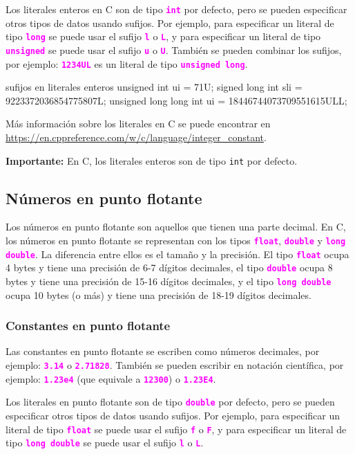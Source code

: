 \documentclass[]{scrartcl}
\newcommand{\hl}[1]{\textcolor{magenta}{\textbf{\texttt{#1}}}}
\begin{document}
Los literales enteros en C son de tipo \hl{int} por defecto, pero se pueden especificar otros tipos de datos usando sufijos. Por ejemplo, para especificar un literal de tipo \hl{long} se puede usar el sufijo \hl{l} o \hl{L}, y para especificar un literal de tipo \hl{unsigned} se puede usar el sufijo \hl{u} o \hl{U}. También se pueden combinar los sufijos, por ejemplo: \hl{1234UL} es un literal de tipo \hl{unsigned long}.

\begin{cbox}{sufijos en literales enteros}
  unsigned int ui = 71U;
  signed long int sli = 9223372036854775807L;
  unsigned long long int ui = 18446744073709551615ULL;
\end{cbox}

Más información sobre los literales en C se puede encontrar en \url{https://en.cppreference.com/w/c/language/integer_constant}.
\begin{importantbox}
  \textbf{Importante:} En C, los literales enteros son de tipo \texttt{int} por defecto.
\end{importantbox}

\subsection*{Números en punto flotante}

Los números en punto flotante son aquellos que tienen una parte decimal. En C, los números en punto flotante se representan con los tipos \hl{float}, \hl{double} y \hl{long double}. La diferencia entre ellos es el tamaño y la precisión. El tipo \hl{float} ocupa 4 bytes y tiene una precisión de 6-7 dígitos decimales, el tipo \hl{double} ocupa 8 bytes y tiene una precisión de 15-16 dígitos decimales, y el tipo \hl{long double} ocupa 10 bytes (o más) y tiene una precisión de 18-19 dígitos decimales.

\subsubsection*{Constantes en punto flotante}

Las constantes en punto flotante se escriben como números decimales, por ejemplo: \hl{3.14} o \hl{2.71828}. También se pueden escribir en notación científica, por ejemplo: \hl{1.23e4} (que equivale a \hl{12300}) o \hl{1.23E4}.

Los literales en punto flotante son de tipo \hl{double} por defecto, pero se pueden especificar otros tipos de datos usando sufijos. Por ejemplo, para especificar un literal de tipo \hl{float} se puede usar el sufijo \hl{f} o \hl{F}, y para especificar un literal de tipo \hl{long double} se puede usar el sufijo \hl{l} o \hl{L}. 
\end{document}
